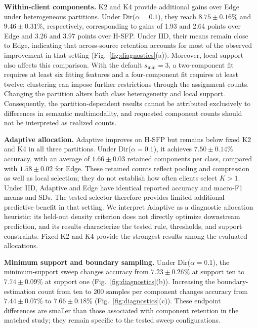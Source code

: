 \noindent\textbf{Within-client components.} K2 and K4 provide additional gains over Edge under heterogeneous partitions. Under Dir($\alpha=0.1$), they reach $8.75\pm0.16\%$ and $9.46\pm0.31\%$, respectively, corresponding to gains of 1.93 and 2.64 points over Edge and 3.26 and 3.97 points over H-SFP. Under IID, their means remain close to Edge, indicating that across-source retention accounts for most of the observed improvement in that setting (Fig.~\ref{fig:diagnostics}(a)).
Moreover, local support also affects this comparison. With the default $s_{\min}=3$, a two-component fit requires at least six fitting features and a four-component fit requires at least twelve; clustering can impose further restrictions through the assignment counts. Changing the partition alters both class heterogeneity and local support. Consequently, the partition-dependent results cannot be attributed exclusively to differences in semantic multimodality, and requested component counts should not be interpreted as realized counts.

\noindent\textbf{Adaptive allocation.} Adaptive improves on H-SFP but remains below fixed K2 and K4 in all three partitions. Under Dir($\alpha=0.1$), it achieves $7.50\pm0.14\%$ accuracy, with an average of $1.66\pm0.03$ retained components per class, compared with $1.58\pm0.02$ for Edge. These retained counts reflect pooling and compression as well as local selection; they do not establish how often clients select $K>1$.
Under IID, Adaptive and Edge have identical reported accuracy and macro-F1 means and SDs. The tested selector therefore provides limited additional predictive benefit in that setting. We interpret Adaptive as a diagnostic allocation heuristic: its held-out density criterion does not directly optimize downstream prediction, and its results characterize the tested rule, thresholds, and support constraints. Fixed K2 and K4 provide the strongest results among the evaluated allocations.

\noindent\textbf{Minimum support and boundary sampling.} Under Dir($\alpha=0.1$), the minimum-support sweep changes accuracy from $7.23\pm0.26\%$ at support ten to $7.74\pm0.09\%$ at support one (Fig.~\ref{fig:diagnostics}(b)). Increasing the boundary-estimation count from ten to 200 samples per component changes accuracy from $7.44\pm0.07\%$ to $7.66\pm0.18\%$ (Fig.~\ref{fig:diagnostics}(c)). These endpoint differences are smaller than those associated with component retention in the matched study; they remain specific to the tested sweep configurations.

